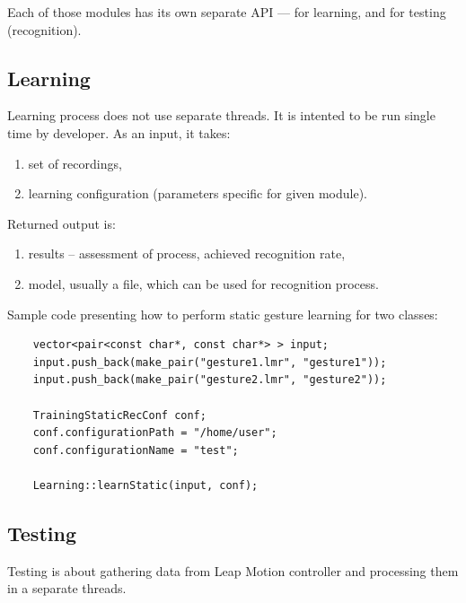 Each of those modules has its own separate API --- for learning, and for testing (recognition).
	
\subsection{Learning}

Learning process does not use separate threads. It is intented to be run single time by developer. As an input, it takes:
\begin{enumerate}
	\item set of recordings,
	\item learning configuration (parameters specific for given module).
\end{enumerate}
Returned output is:
\begin{enumerate}
	\item results -- assessment of process, achieved recognition rate,
	\item model, usually a file, which can be used for recognition process.
\end{enumerate}

Sample code presenting how to perform static gesture learning for two classes:
\begin{lstlisting}
	vector<pair<const char*, const char*> > input;
	input.push_back(make_pair("gesture1.lmr", "gesture1"));
	input.push_back(make_pair("gesture2.lmr", "gesture2"));

	TrainingStaticRecConf conf;
	conf.configurationPath = "/home/user";
	conf.configurationName = "test";

	Learning::learnStatic(input, conf);
\end{lstlisting}


\subsection{Testing}

Testing is about gathering data from Leap Motion controller and processing them in a separate threads.

